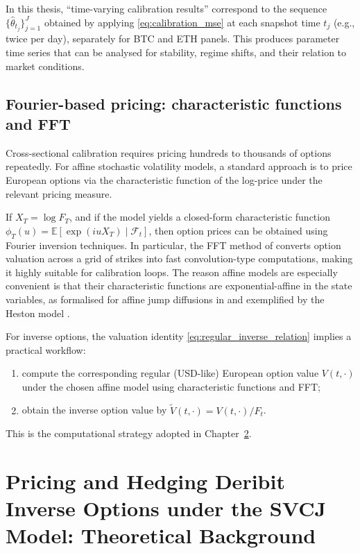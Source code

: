 \documentclass[a4paper,titlepage,12pt]{report}
\theoremstyle{plain}
\begin{document}
In this thesis, ``time-varying calibration results'' correspond to the sequence
$\{\widehat{\theta}_{t_j}\}_{j=1}^J$ obtained by applying \eqref{eq:calibration_mse} at each snapshot
time $t_j$ (e.g., twice per day), separately for BTC and ETH panels. This produces parameter time
series that can be analysed for stability, regime shifts, and their relation to market conditions.

\section{Fourier-based pricing: characteristic functions and FFT}\label{sec:fft_affine}

Cross-sectional calibration requires pricing hundreds to thousands of options repeatedly. For affine stochastic volatility models, a standard approach is to price European options via the characteristic function of the log-price under the relevant pricing measure.

If $X_T=\log F_T$, and if the model yields a closed-form characteristic function $\phi_T(u)=\mathbb{E}[\exp(iuX_T)\mid\mathcal{F}_t]$, then option
prices can be obtained using Fourier inversion techniques. In particular, the FFT method of
\citet{CarrMadan1999} converts option valuation across a grid of strikes into fast convolution-type
computations, making it highly suitable for calibration loops. The reason affine models are
especially convenient is that their characteristic functions are exponential-affine in the state
variables, as formalised for affine jump diffusions in \citet{DuffiePanSingleton2000} and exemplified
by the Heston model \citep{Heston1993}.

For inverse options, the valuation identity \eqref{eq:regular_inverse_relation} implies a practical
workflow:
\begin{enumerate}[leftmargin=2em]
\item compute the corresponding regular (USD-like) European option value $V(t,\cdot)$ under the chosen
affine model using characteristic functions and FFT;
\item obtain the inverse option value by $\widetilde V(t,\cdot)=V(t,\cdot)/F_t$.
\end{enumerate}
This is the computational strategy adopted in Chapter~\ref{chap:svcj_inverse}.








\chapter{Pricing and Hedging Deribit Inverse Options under the SVCJ Model: Theoretical Background}
\label{chap:svcj_inverse}
\end{document}
